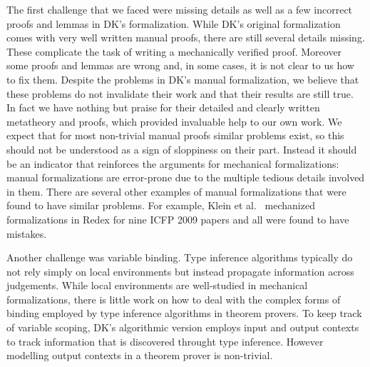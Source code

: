 The first challenge that we faced were missing details as well as
a few incorrect proofs and lemmas in DK's formalization. While DK's
original formalization comes with very well written manual proofs,
there are still several details missing. These complicate the task of
writing a mechanically verified proof. Moreover some proofs and
lemmas are wrong and, in some cases, it is not clear to us how to fix them.
Despite the problems in DK's manual formalization,
we believe that these problems do not
invalidate their work and that their results are still true. In fact we have nothing but praise for their detailed
and clearly written metatheory and proofs, which provided invaluable
help to our own work.
We expect that for most non-trivial manual
proofs similar problems exist, so this should not be understood as a sign of sloppiness
on their part. Instead it should be an indicator that reinforces the arguments
for mechanical formalizations: manual formalizations are error-prone due to the multiple
tedious details involved in them.
There are several other examples of manual formalizations that were found to have
similar problems. For example, Klein et al.~\cite{KleinRunYourResearch}
mechanized formalizations
in Redex for nine ICFP 2009 papers and all were found to have mistakes.

Another challenge was variable binding. Type inference algorithms
typically do not rely simply on local environments but instead
propagate information across judgements. While local environments are
well-studied in mechanical formalizations, there is little work on how
to deal with the complex forms of binding employed by type inference algorithms
in theorem provers. To
keep track of variable scoping, DK's algorithmic version employs input
and output contexts to track information that is discovered throught
type inference. However modelling output contexts in a theorem prover
is non-trivial.

